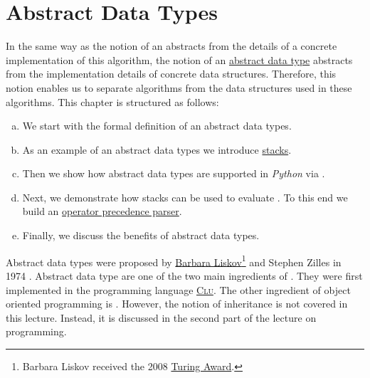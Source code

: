 \chapter{Abstract Data Types}
In the same way as the notion of an  abstracts from the details of a concrete
implementation of this algorithm, the notion of an \href{https://en.wikipedia.org/wiki/Abstract_data_type}{abstract data type} abstracts from the implementation
details of concrete data structures.  Therefore, this notion enables us to separate algorithms from the data
structures used in these algorithms.  This chapter is structured as follows:
\begin{enumerate}[(a)]
\item We start with the formal definition of an abstract data types.  
\item As an example of an abstract data types we introduce
      \href{https://en.wikipedia.org/wiki/Stack_(abstract_data_type)}{stacks}. 
\item Then we show how abstract data types are supported in \textsl{Python} via .  
\item Next, we demonstrate how stacks can be used to evaluate .  To this end we build an
      \href{https://en.wikipedia.org/wiki/Operator-precedence_parser}{operator precedence parser}. 
\item Finally, we discuss the benefits of abstract data types.
\end{enumerate}
Abstract data types were proposed by 
\href{https://en.wikipedia.org/wiki/Barbara_Liskov}{Barbara Liskov}\footnote{
  Barbara Liskov received the 2008 \href{https://en.wikipedia.org/wiki/Turing_Award}{Turing Award}.
} 
and Stephen Zilles in 1974 \cite{liskov:1974}.  Abstract data type are one of the two main ingredients of
.  They were first implemented in the programming language
\href{https://en.wikipedia.org/wiki/CLU_(programming_language)}{\textsc{Clu}}. 
The other ingredient of object oriented programming is .  However, the notion of inheritance
is not covered in this lecture.  Instead, it is discussed in the second part of the lecture on programming.

